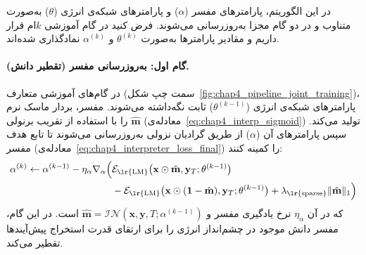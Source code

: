 در این الگوریتم، پارامترهای مفسر ($\alpha$) و پارامترهای شبکه‌ی انرژی ($\theta$) به‌صورت متناوب و در دو گام مجزا به‌روزرسانی می‌شوند. فرض کنید در گام آموزشی $k$ام قرار داریم و مقادیر پارامترها به‌صورت $\theta^{(k)}$ و $\alpha^{(k)}$ نمادگذاری شده‌اند.

\paragraph{گام اول: به‌روزرسانی مفسر (تقطیر دانش).}
در گام‌های آموزشی متعارف (سمت چپ شکل~\ref{fig:chap4_pipeline_joint_training})، پارامترهای شبکه‌ی انرژی ($\theta^{(k-1)}$) ثابت نگه‌داشته می‌شوند. مفسر، بردار ماسک نرم $\hat{\mathbf{m}}$ را با استفاده از تقریب برنولی (معادله‌ی~\ref{eq:chap4_interp_sigmoid}) تولید می‌کند. سپس پارامترهای آن ($\alpha$) از طریق گرادیان نزولی به‌روزرسانی می‌شوند تا تابع هدف مفسر (معادله‌ی~\ref{eq:chap4_interpreter_loss_final}) را کمینه کنند:
\begin{equation}\label{eq:chap4_update_interpreter}\vspace{0.25cm}
    \begin{split}
        \alpha^{(k)} \leftarrow \alpha^{(k-1)} - \eta_{\alpha} \nabla_\alpha \Big( &\mathcal{E}_{\text{\lr{LM}}}\big(\mathbf{x} \odot \hat{\mathbf{m}}, \mathbf{y}_T; \theta^{(k-1)}\big) \\
        &- \mathcal{E}_{\text{\lr{LM}}}\big(\mathbf{x} \odot (\mathbf{1} - \hat{\mathbf{m}}), \mathbf{y}_T; \theta^{(k-1)}\big) + \lambda_{\text{\lr{sparse}}} \|\hat{\mathbf{m}}\|_1 \Big)
    \end{split}\vspace{0.25cm}
\end{equation}
که در آن $\eta_{\alpha}$ نرخ یادگیری مفسر و $\hat{\mathbf{m}} = \mathcal{IN}(\mathbf{x}, \mathbf{y}, T; \alpha^{(k-1)})$ است. در این گام، مفسر دانش موجود در چشم‌انداز انرژی را برای ارتقای قدرت استخراج پیش‌آیندها تقطیر می‌کند.

